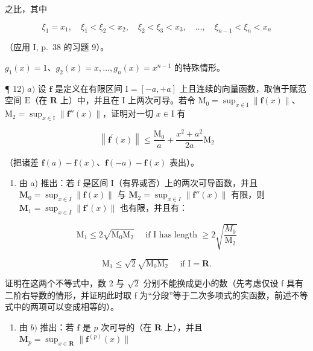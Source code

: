 之比，其中

\[
\xi_ {1} = x _ {1}, \quad \xi_ {1} <   \xi_ {2} <   x _ {2}, \quad \xi_ {2} <   \xi_ {3} <   x _ {3}, \quad \dots , \quad \xi_ {n - 1} <   \xi_ {n} <   x _ {n}
\]

（应用 I, p.~38 的习题 9）。

\(g_{1}(x)=1\)、\(g_{2}(x)=x,\ldots,g_{n}(x)=x^{n-1}\) 的特殊情形。

¶ 12) \(a)\) 设 \(\mathbf{f}\) 是定义在有限区间 \(\mathrm{I} = [-a, + a]\) 上且连续的向量函数，取值于赋范空间 \(\mathrm{E}\)（在 \(\mathbf{R}\) 上）中，并且在 \(\mathrm{I}\) 上两次可导。若令 \(\mathrm{M}_0 = \sup_{x\in \mathrm{I}}\| \mathbf{f}(x)\|\)、\(\mathrm{M}_2 = \sup_{x\in \mathrm{I}}\| \mathbf{f}''(x)\|\)，证明对一切 \(x\in \mathrm{I}\) 有

\[
\left\| \mathbf {f} ^ {\prime} (x) \right\| \leqslant \frac {\mathrm{M} _ {0}}{a} + \frac {x ^ {2} + a ^ {2}}{2 a} \mathrm{M} _ {2}
\]

（把诸差 \(\mathbf{f}(a) - \mathbf{f}(x)\)、\(\mathbf{f}(-a) - \mathbf{f}(x)\) 表出）。

\begin{enumerate}
\def\labelenumi{\alph{enumi})}
\setcounter{enumi}{1}
\tightlist
\item
  由 a) 推出：若 f 是区间 I（有界或否）上的两次可导函数，并且 \(\mathbf{M}_{0} = \sup_{x \in I} \| \mathbf{f}(x) \|\) 与 \(\mathbf{M}_{2} = \sup_{x \in I} \| \mathbf{f}''(x) \|\) 有限，则 \(\mathbf{M}_{1} = \sup_{x \in I} \| \mathbf{f}'(x) \|\) 也有限，并且有：
\end{enumerate}

\[
\mathrm{M} _ {1} \leqslant 2 \sqrt {\mathrm{M} _ {0} \mathrm{M} _ {2}} \quad \text { if   I   has   length } \geqslant 2 \sqrt {\frac {M _ {0}}{\mathrm{M} _ {2}}}
\]

\[
\mathrm{M} _ {1} \leqslant \sqrt {2} \sqrt {\mathrm{M} _ {0} \mathrm{M} _ {2}} \quad \text { if } \mathrm{I} = \mathbf {R}.
\]

证明在这两个不等式中，数 2 与 \(\sqrt{2}\) 分别不能换成更小的数（先考虑仅设 f 具有二阶右导数的情形，并证明此时取 f 为“分段”等于二次多项式的实函数，前述不等式中的两项可以变成相等的）。

\begin{enumerate}
\def\labelenumi{\alph{enumi})}
\setcounter{enumi}{2}
\tightlist
\item
  由 \(b)\) 推出：若 \(\mathbf{f}\) 是 \(p\) 次可导的（在 \(\mathbf{R}\) 上），并且 \(\mathbf{M}_p = \sup_{x \in \mathbf{R}} \| \mathbf{f}^{(p)}(x) \|\)
\end{enumerate}

